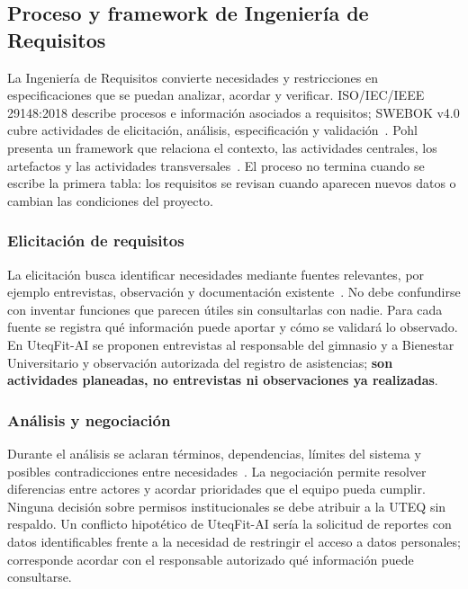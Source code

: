\subsection{Proceso y framework de Ingeniería de Requisitos}
\label{sec:proceso-framework}

La Ingeniería de Requisitos convierte necesidades y restricciones en especificaciones que se puedan analizar, acordar y verificar. ISO/IEC/IEEE 29148:2018 describe procesos e información asociados a requisitos; SWEBOK v4.0 cubre actividades de elicitación, análisis, especificación y validación~\cite{ieee29148,swebok2024}. Pohl presenta un framework que relaciona el contexto, las actividades centrales, los artefactos y las actividades transversales~\cite{pohl2025}. El proceso no termina cuando se escribe la primera tabla: los requisitos se revisan cuando aparecen nuevos datos o cambian las condiciones del proyecto.

\subsubsection{Elicitación de requisitos}
La elicitación busca identificar necesidades mediante fuentes relevantes, por ejemplo entrevistas, observación y documentación existente~\cite{ieee29148,swebok2024}. No debe confundirse con inventar funciones que parecen útiles sin consultarlas con nadie. Para cada fuente se registra qué información puede aportar y cómo se validará lo observado. En UteqFit-AI se proponen entrevistas al responsable del gimnasio y a Bienestar Universitario y observación autorizada del registro de asistencias; \textbf{son actividades planeadas, no entrevistas ni observaciones ya realizadas}.

\subsubsection{Análisis y negociación}
Durante el análisis se aclaran términos, dependencias, límites del sistema y posibles contradicciones entre necesidades~\cite{swebok2024,pohl2025}. La negociación permite resolver diferencias entre actores y acordar prioridades que el equipo pueda cumplir. Ninguna decisión sobre permisos institucionales se debe atribuir a la UTEQ sin respaldo. Un conflicto hipotético de UteqFit-AI sería la solicitud de reportes con datos identificables frente a la necesidad de restringir el acceso a datos personales; corresponde acordar con el responsable autorizado qué información puede consultarse.

